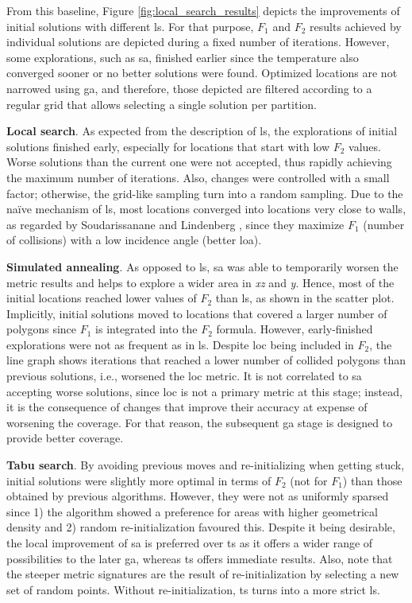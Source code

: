 From this baseline, Figure \ref{fig:local_search_results} depicts the improvements of initial solutions with different \acrshort{ls}. For that purpose, $F_1$ and $F_2$ results achieved by individual solutions are depicted during a fixed number of iterations. However, some explorations, such as \acrshort{sa}, finished earlier since the temperature also converged sooner or no better solutions were found. Optimized locations are not narrowed using \acrshort{ga}, and therefore, those depicted are filtered according to a regular grid that allows selecting a single solution per partition.

\textbf{Local search}. As expected from the description of \acrshort{ls}, the explorations of initial solutions finished early, especially for locations that start with low $F_2$ values. Worse solutions than the current one were not accepted, thus rapidly achieving the maximum number of iterations. Also, changes were controlled with a small factor; otherwise, the grid-like sampling turn into a random sampling. Due to the naïve mechanism of \acrshort{ls}, most locations converged into locations very close to walls, as regarded by Soudarissanane and Lindenberg \cite{soudarissanane_optimizing_2012}, since they maximize $F_1$ (number of collisions) with a low incidence angle (better \acrshort{loa}).

\textbf{Simulated annealing}. As opposed to \acrshort{ls}, \acrshort{sa} was able to temporarily worsen the metric results and helps to explore a wider area in \textit{xz} and \textit{y}. Hence, most of the initial locations reached lower values of $F_2$ than \acrshort{ls}, as shown in the scatter plot. Implicitly, initial solutions moved to locations that covered a larger number of polygons since $F_1$ is integrated into the $F_2$ formula. However, early-finished explorations were not as frequent as in \acrshort{ls}. Despite \acrshort{loc} being included in $F_2$, the line graph shows iterations that reached a lower number of collided polygons than previous solutions, i.e., worsened the \acrshort{loc} metric. It is not correlated to \acrshort{sa} accepting worse solutions, since \acrshort{loc} is not a primary metric at this stage; instead, it is the consequence of changes that improve their accuracy at expense of worsening the coverage. For that reason, the subsequent \acrshort{ga} stage is designed to provide better coverage.

\textbf{Tabu search}. By avoiding previous moves and re-initializing when getting stuck, initial solutions were slightly more optimal in terms of $F_2$ (not for $F_1$) than those obtained by previous algorithms. However, they were not as uniformly sparsed since 1) the algorithm showed a preference for areas with higher geometrical density and 2) random re-initialization favoured this. Despite it being desirable, the local improvement of \acrshort{sa} is preferred over \acrshort{ts} as it offers a wider range of possibilities to the later \acrshort{ga}, whereas \acrshort{ts} offers immediate results. Also, note that the steeper metric signatures are the result of re-initialization by selecting a new set of random points. Without re-initialization, \acrshort{ts} turns into a more strict \acrshort{ls}.

